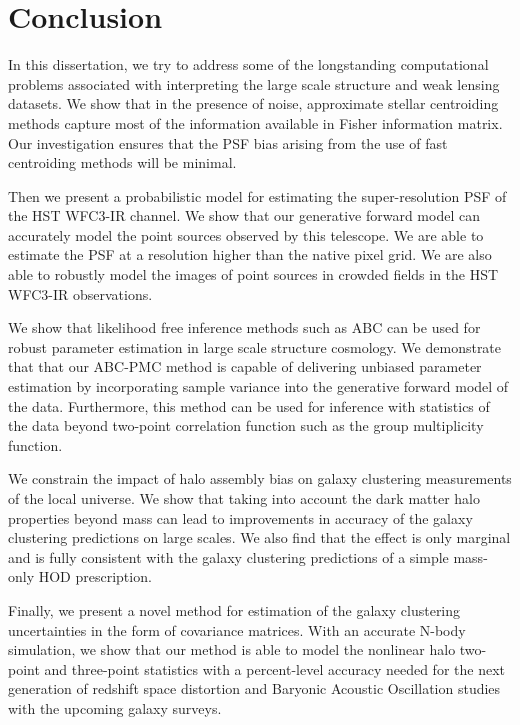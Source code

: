 \chapter*{Conclusion}

In this dissertation, we try to address some of the longstanding computational problems associated with 
interpreting the large scale structure and weak lensing datasets.
We show that in the presence of noise, approximate stellar centroiding methods capture most of the 
information available in Fisher information matrix. Our investigation ensures that the PSF bias arising 
from the use of fast centroiding methods will be minimal. 

Then we present a probabilistic model for estimating the super-resolution PSF of the HST WFC3-IR channel.
We show that our generative forward model can accurately model the point sources observed by this telescope. We are able 
to estimate the PSF at a resolution higher than the native pixel grid. We are also able to robustly model the images of 
point sources in crowded fields in the HST WFC3-IR observations.

We show that likelihood free inference methods such as ABC can be used for robust parameter estimation 
in large scale structure cosmology. We demonstrate that that our ABC-PMC method is capable of delivering unbiased 
parameter estimation by incorporating sample variance into the generative forward model of the data. Furthermore, this method can be used 
for inference with statistics of the data beyond two-point correlation function such as the group multiplicity function.

We constrain the impact of halo assembly bias on galaxy clustering measurements of the local universe. 
We show that taking into account the dark matter halo properties beyond mass can lead to improvements in 
accuracy of the galaxy clustering predictions on large scales. We also find that the effect is only marginal and is fully consistent 
with the galaxy clustering predictions of a simple mass-only HOD prescription.

Finally, we present a novel method for estimation of the galaxy clustering uncertainties in the form of covariance matrices. 
With an accurate N-body simulation, we show that our method is able to model the nonlinear halo two-point and three-point statistics with a 
percent-level accuracy needed for the next generation of redshift space distortion and Baryonic Acoustic Oscillation 
studies with the upcoming galaxy surveys.










